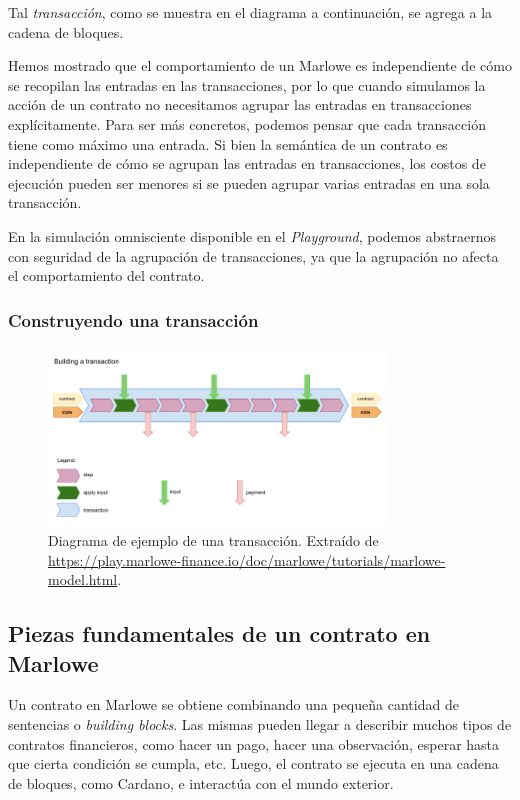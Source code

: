 \documentclass[12pt]{book}
\begin{document}
Tal \textit{transacción}, como se muestra en el diagrama a continuación, se agrega a la cadena de bloques. 

Hemos mostrado que el comportamiento de un Marlowe es independiente de cómo se recopilan las entradas en las transacciones, por lo que cuando simulamos la acción de un contrato no necesitamos agrupar las entradas en transacciones explícitamente. Para ser más concretos, podemos pensar que cada transacción tiene como máximo una entrada. Si bien la semántica de un contrato es independiente de cómo se agrupan las entradas en transacciones, los costos de ejecución pueden ser menores si se pueden agrupar varias entradas en una sola transacción.

En la simulación omnisciente disponible en el \textit{Playground}, podemos abstraernos con seguridad de la agrupación de transacciones, ya que la agrupación no afecta el comportamiento del contrato.

\subsubsection{Construyendo una transacción}

\begin{figure}[H]
    \centering
    \includegraphics[width=0.8\textwidth]{Transaccion.png}
    \caption{Diagrama de ejemplo de una transacción. Extraído de \url{https://play.marlowe-finance.io/doc/marlowe/tutorials/marlowe-model.html}.}\label{fig:Transaccion}
\end{figure}


\subsection{Piezas fundamentales de un contrato en Marlowe}\label{sec:constructores_marlowe}
Un contrato en Marlowe se obtiene combinando una pequeña cantidad de sentencias o \textit{building blocks}. Las mismas pueden llegar a describir muchos tipos de contratos financieros, como hacer un pago, hacer una observación, esperar hasta que cierta condición se cumpla, etc. Luego, el contrato se ejecuta en una cadena de bloques, como Cardano, e interactúa con el mundo exterior.
\end{document}
